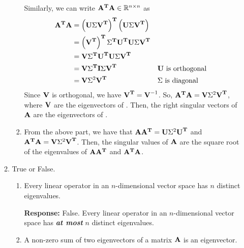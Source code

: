 \documentclass [12pt] {article}
\newcommand{\R}{\mathbb{R}}
\newcommand{\T}{\bf{T}}
\renewcommand{\it}[1]{\textit{{#1}}}
\renewcommand{\bf}[1]{\textbf{{#1}}}
\newcommand{\ib}[1]{\it{\bf{{#1}}}}
\begin{document}
\begin{enumerate}
\begin{enumerate}
\begin{enumerate}
                        Similarly, we can write $\AT \A \in \R^{n \times n}$ as
                        \begin{align*}
                            \AT \A &= \left( \U \Sigma \V^{\T} \right)^{\T} \left( \U \Sigma \V^{\T} \right) \\
                                   &= \left( \V^{\T} \right)^{\T} \Sigma^{\T} \U^{\T} \U \Sigma \V^{\T} \\
                                   &= \V \Sigma^{\T} \U^{\T} \U \Sigma \V ^{\T} \\
                                   &= \V \Sigma^{\T} \bf{I} \Sigma \V ^{\T} && \U \text{ is orthogonal} \\
                                   &= \V \Sigma^2 \V ^{\T} && \Sigma \text{ is diagonal} \\
                        \end{align*}
                        Since $\V$ is orthogonal, we have $\V^{\T} = \V^{-1}$. So,
                        $\AT \A = \V \Sigma^2 \V^{\T}$, where $\V$ are the eigenvectors of 
                        \AT \A. Then, the right singular vectors of $\A$ are the eigenvectors of 
                        \AT \A.
                    \item From the above part, we have that $\A \AT = \U \Sigma^2 \U^{\T}$ and
                        $\AT \A = \V \Sigma^2 \V^{\T}$. Then, the singular values of $\A$ are 
                        the square root of the eigenvalues of $\A \AT$ and $\AT \A$.
                \end{enumerate}
            \item True or False.
                \begin{enumerate}
                    \item Every linear operator in an $n$-dimensional vector space has $n$ distinct 
                        eigenvalues. \vspace{10pt}

                        \bf{Response:} False. Every linear operator in an $n$-dimensional 
                        vector space has \ib{at most} $n$ distinct eigenvalues.

                    \item A non-zero sum of two eigenvectors of a matrix $\A$ is an eigenvector. \vspace{10pt}


\end{enumerate}
\end{enumerate}
\end{enumerate}
\end{document}
